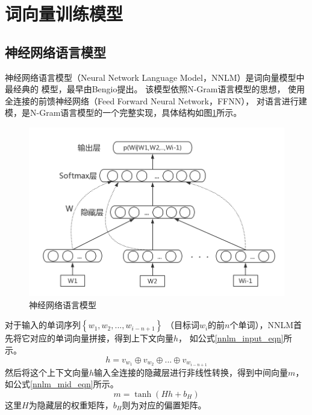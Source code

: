 \documentclass{standalone}
\begin{document}
\section{词向量训练模型}
\subsection{神经网络语言模型}
神经网络语言模型（Neural Network Language Model，NNLM）是词向量模型中最经典的
模型，最早由Bengio提出。
该模型依照N-Gram语言模型的思想，
使用全连接的前馈神经网络（Feed Forward Neural Network，FFNN），
对语言进行建模，是N-Gram语言模型的一个完整实现，具体结构如图\ref{nnlm}所示。
\begin{figure}[h]
    \includegraphics[scale=0.5]{picture/nnlm.png}
    \caption{神经网络语言模型}
    \label{nnlm}
\end{figure}

对于输入的单词序列$\left \{ w_{1},w_{2},...,w_{i-n+1} \right \}$
（目标词$w_i$的前$n$个单词），NNLM首先将它对应的单词向量拼接，得到上下文向量$h$，
如公式\ref{nnlm_input_eqn}所示。
\begin{equation}
    h = v_{w_1} \oplus v_{w_2} \oplus ... \oplus v_{w_{i-n+1}}
    \label{nnlm_input_eqn}
\end{equation}
然后将这个上下文向量$h$输入全连接的隐藏层进行非线性转换，得到中间向量$m$，
如公式\ref{nnlm_mid_eqn}所示。
\begin{equation}
    m = \tanh \left ( Hh+b_H \right )
    \label{nnlm_mid_eqn}
\end{equation}
这里$H$为隐藏层的权重矩阵，$b_H$则为对应的偏置矩阵。
\end{document}
